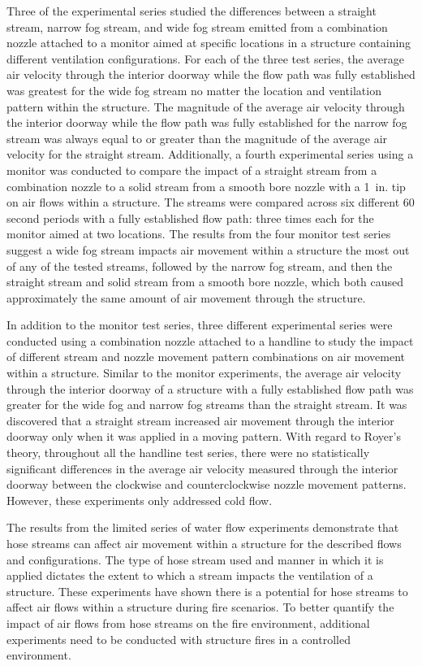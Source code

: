 \documentclass[12pt,oneside]{book}
\begin{document}
Three of the experimental series studied the differences between a straight stream, narrow fog stream, and wide fog stream emitted from a combination nozzle attached to a monitor aimed at specific locations in a structure containing different ventilation configurations. For each of the three test series, the average air velocity through the interior doorway while the flow path was fully established was greatest for the wide fog stream no matter the location and ventilation pattern within the structure. The magnitude of the average air velocity through the interior doorway while the flow path was fully established for the narrow fog stream was always equal to or greater than the magnitude of the average air velocity for the straight stream. Additionally, a fourth experimental series using a monitor was conducted to compare the impact of a straight stream from a combination nozzle to a solid stream from a smooth bore nozzle with a 1~in. tip on air flows within a structure. The streams were compared across six different 60 second periods with a fully established flow path: three times each for the monitor aimed at two locations. The results from the four monitor test series suggest a wide fog stream impacts air movement within a structure the most out of any of the tested streams, followed by the narrow fog stream, and then the straight stream and solid stream from a smooth bore nozzle, which both caused approximately the same amount of air movement through the structure.

In addition to the monitor test series, three different experimental series were conducted using a combination nozzle attached to a handline to study the impact of different stream and nozzle movement pattern combinations on air movement within a structure. Similar to the monitor experiments, the average air velocity through the interior doorway of a structure with a fully established flow path was greater for the wide fog and narrow fog streams than the straight stream. It was discovered that a straight stream increased air movement through the interior doorway only when it was applied in a moving pattern. With regard to Royer's theory, throughout all the handline test series, there were no statistically significant differences in the average air velocity measured through the interior doorway between the clockwise and counterclockwise nozzle movement patterns. However, these experiments only addressed cold flow.

The results from the limited series of water flow experiments demonstrate that hose streams can affect air movement within a structure for the described flows and configurations. The type of hose stream used and manner in which it is applied dictates the extent to which a stream impacts the ventilation of a structure. These experiments have shown there is a potential for hose streams to affect air flows within a structure during fire scenarios. To better quantify the impact of air flows from hose streams on the fire environment, additional experiments need to be conducted with structure fires in a controlled environment.
\end{document}

